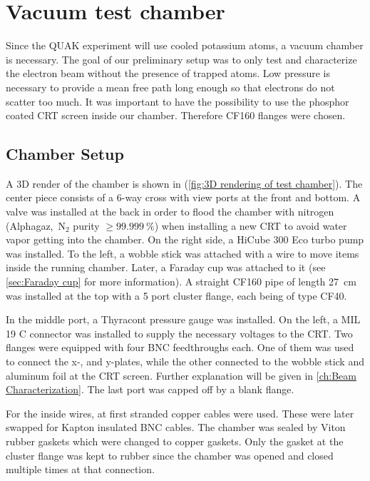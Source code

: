 
\chapter{Vacuum test chamber}
\label{ch:Vacuum chamber}

Since the QUAK experiment will use cooled potassium atoms, a vacuum chamber is necessary. The goal of our preliminary setup was to only test and characterize the electron beam without the presence of trapped atoms. Low pressure is necessary to provide a mean free path long enough so that electrons do not scatter too much. It was important to have the possibility to use the phosphor coated CRT screen inside our chamber. Therefore CF160 flanges were chosen. 


\section{Chamber Setup}
\label{sec:Chamber Setup}

A 3D render of the chamber is shown in (\cref{fig:3D rendering of test chamber}). The center piece consists of a 6-way cross with view ports at the front and bottom. A valve was installed at the back in order to flood the chamber with nitrogen (Alphagaz\texttrademark,~N$_2$ purity $\ge\SI{99.999}{\percent}$) when installing a new CRT to avoid water vapor getting into the chamber. On the right side, a HiCube 300 Eco turbo pump was installed. To the left, a wobble stick was attached with a wire to move items inside the running chamber. Later, a Faraday cup was attached to it (see \cref{sec:Faraday cup} for more information). A straight CF160 pipe of length \SI{27}{\centi\meter} was installed at the top with a 5 port cluster flange, each being of type CF40.
 
In the middle port, a Thyracont  pressure gauge was installed. On the left, a MIL 19 C connector was installed to supply the necessary voltages to the CRT. Two flanges were equipped with four BNC feedthroughs each. One of them was used to connect the x-, and y-plates, while the other connected to the wobble stick and aluminum foil at the CRT screen. Further explanation will be given in \cref{ch:Beam Characterization}. The last port was capped off by a blank flange.
 
For the inside wires, at first stranded copper cables were used. These were later swapped for Kapton insulated BNC cables. The chamber was sealed by Viton rubber gaskets which were changed to copper gaskets. Only the gasket at the cluster flange was kept to rubber since the chamber was opened and closed multiple times at that connection.
 
